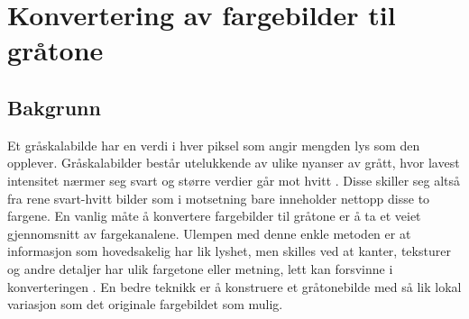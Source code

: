 \section{Konvertering av fargebilder til gråtone}
\label{sec:gråtone}
\subsection{Bakgrunn}
Et gråskalabilde har en  verdi i hver piksel som angir mengden lys som den opplever. Gråskalabilder består utelukkende av ulike nyanser av grått, hvor lavest intensitet nærmer seg svart og større verdier går mot hvitt \cite{wiki:grayscale}. Disse skiller seg altså fra rene svart-hvitt bilder som i motsetning bare inneholder nettopp disse to fargene. En vanlig måte å konvertere fargebilder til gråtone er å ta et veiet gjennomsnitt av fargekanalene. Ulempen med denne enkle metoden er at informasjon som hovedsakelig har lik lyshet, men skilles ved at kanter, teksturer og andre detaljer har ulik fargetone eller metning, lett kan forsvinne i konverteringen \cite{prosjekt}.
\newline En bedre teknikk er å konstruere et gråtonebilde med så lik lokal variasjon som det originale fargebildet som mulig. 

